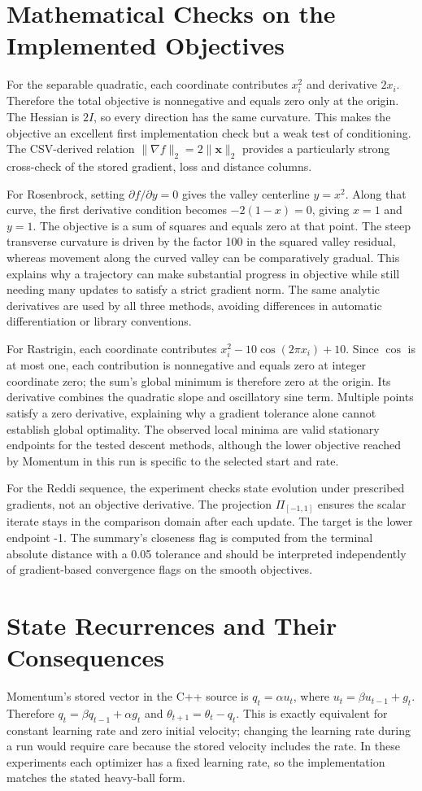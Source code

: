 \documentclass[conference]{IEEEtran}
\begin{document}
\section{Mathematical Checks on the Implemented Objectives}
For the separable quadratic, each coordinate contributes $x_i^2$ and derivative $2x_i$. Therefore the total objective is nonnegative and equals zero only at the origin. The Hessian is $2I$, so every direction has the same curvature. This makes the objective an excellent first implementation check but a weak test of conditioning. The CSV-derived relation $\|\nabla f\|_2=2\|\mathbf{x}\|_2$ provides a particularly strong cross-check of the stored gradient, loss and distance columns.

For Rosenbrock, setting $\partial f/\partial y=0$ gives the valley centerline $y=x^2$. Along that curve, the first derivative condition becomes $-2(1-x)=0$, giving $x=1$ and $y=1$. The objective is a sum of squares and equals zero at that point. The steep transverse curvature is driven by the factor 100 in the squared valley residual, whereas movement along the curved valley can be comparatively gradual. This explains why a trajectory can make substantial progress in objective while still needing many updates to satisfy a strict gradient norm. The same analytic derivatives are used by all three methods, avoiding differences in automatic differentiation or library conventions.

For Rastrigin, each coordinate contributes $x_i^2-10\cos(2\pi x_i)+10$. Since $\cos$ is at most one, each contribution is nonnegative and equals zero at integer coordinate zero; the sum's global minimum is therefore zero at the origin. Its derivative combines the quadratic slope and oscillatory sine term. Multiple points satisfy a zero derivative, explaining why a gradient tolerance alone cannot establish global optimality. The observed local minima are valid stationary endpoints for the tested descent methods, although the lower objective reached by Momentum in this run is specific to the selected start and rate.

For the Reddi sequence, the experiment checks state evolution under prescribed gradients, not an objective derivative. The projection $\Pi_{[-1,1]}$ ensures the scalar iterate stays in the comparison domain after each update. The target is the lower endpoint -1. The summary's closeness flag is computed from the terminal absolute distance with a 0.05 tolerance and should be interpreted independently of gradient-based convergence flags on the smooth objectives.
\section{State Recurrences and Their Consequences}
Momentum's stored vector in the C++ source is $q_t=\alpha u_t$, where $u_t=\beta u_{t-1}+g_t$. Therefore $q_t=\beta q_{t-1}+\alpha g_t$ and $\theta_{t+1}=\theta_t-q_t$. This is exactly equivalent for constant learning rate and zero initial velocity; changing the learning rate during a run would require care because the stored velocity includes the rate. In these experiments each optimizer has a fixed learning rate, so the implementation matches the stated heavy-ball form.
\end{document}
